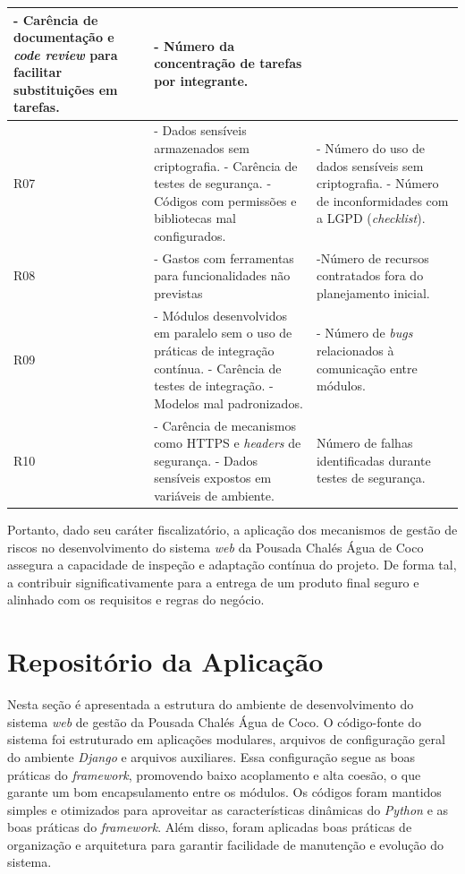 \documentclass[
	12pt,				%
	openany,			%
	twoside,			%
	a4paper,			%
	english,			%
	french,				%
	spanish,			%
	brazil				%
	]{abntex2}
\begin{document}
\begin{quadro}[H]
\begin{tabular} {|p{3cm}|p{6cm}|p{6cm}|}
		- Carência de documentação e \textit{code review} para facilitar substituições em tarefas. & - Número da concentração de tarefas por integrante. 
		\\	\hline
		R07 & - Dados sensíveis armazenados sem criptografia. \newline
		- Carência de testes de segurança. \newline
		- Códigos com permissões e bibliotecas mal configurados.
		& - Número do uso de dados sensíveis sem criptografia. \newline
		  - Número de inconformidades com a LGPD (\textit{checklist}). 
		\\	\hline
		R08 & 	- Gastos com ferramentas para funcionalidades não previstas
		& -Número de recursos contratados fora do planejamento inicial.
		\\	\hline
		R09 & 	- Módulos desenvolvidos em paralelo sem o uso de práticas de integração contínua. \newline
		- Carência de testes de integração. \newline
		- Modelos mal padronizados.
		& - Número de \textit{bugs} relacionados à comunicação entre módulos.
		\\	\hline
		R10 & 	- Carência de mecanismos como HTTPS e \textit{headers} de segurança. \newline
		- Dados sensíveis expostos em variáveis de ambiente.
		& Número de falhas identificadas durante testes de segurança.
		\\ \hline
	\end{tabular}
\end{quadro}
Portanto, dado seu caráter fiscalizatório, a aplicação dos mecanismos de  gestão de riscos no desenvolvimento do sistema \textit{web} da Pousada Chalés Água de Coco assegura a capacidade de inspeção e adaptação contínua do projeto. De forma tal, a contribuir significativamente para a entrega de um produto final seguro e alinhado com os requisitos e regras do negócio. 
\section{Repositório da Aplicação}Nesta seção é apresentada a estrutura do ambiente de desenvolvimento do sistema \textit{web} de gestão da Pousada Chalés Água de Coco. O código-fonte do sistema foi estruturado em aplicações modulares, arquivos de configuração geral do ambiente \textit{Django} e arquivos auxiliares. Essa configuração segue as boas práticas do \textit{framework}, promovendo baixo acoplamento e alta coesão, o que garante um bom encapsulamento entre os módulos. Os códigos foram mantidos simples e otimizados para aproveitar as características dinâmicas do \textit{Python} e as boas práticas do \textit{framework}. Além disso, foram aplicadas boas práticas de organização e arquitetura para garantir facilidade de manutenção e evolução do sistema.
\end{document}
